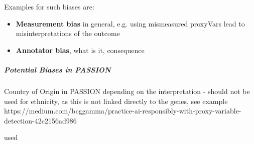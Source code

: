 \documentclass[12pt, a4paper, oneside]{book}   	%
\newif\ifrawcitationactive
\newcommand{\rawcitationstart}{\color{purple}\rawcitationactivetrue}
\begin{document}
			Examples for such biases are:
			\begin{itemize}
				\item \textbf{Measurement bias} in general, e.g. using mismeasured \glspl{proxyVar} lead to misinterpretations of the outcome \autocite{Mehrabi_2021}
				\item \textbf{Annotator bias}, what is it, consequence \autocite{}
			\end{itemize}
			
			
			\subparagraph{Potential Biases in PASSION}
			Country of Origin in PASSION depending on the interpretation - should not be used for ethnicity, as this is not linked directly to the genes, see example https://medium.com/bcggamma/practice-ai-responsibly-with-proxy-variable-detection-42c2156ad986
			
			
			\rawcitationstart
			used
\end{document}
